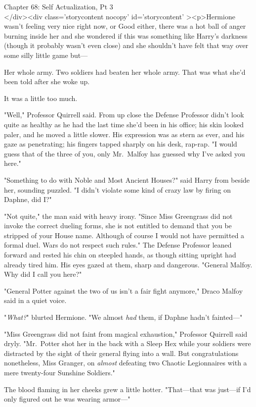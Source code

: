
Chapter 68: Self Actualization, Pt 3\\
</div><div  class='storycontent nocopy' id='storycontent' ><p>Hermione wasn't 
feeling very nice right now, or Good either, there was a hot ball of anger 
burning inside her and she wondered if this was something like Harry's darkness 
(though it probably wasn't even close) and she shouldn't have felt that way 
over some silly little game but---

Her whole army. Two soldiers had beaten her whole army. That was what she'd 
been told after she woke up.

It was a little too much.

"Well," Professor Quirrell said. From up close the Defense Professor didn't 
look quite as healthy as he had the last time she'd been in his office; his 
skin looked paler, and he moved a little slower. His expression was as stern as 
ever, and his gaze as penetrating; his fingers tapped sharply on his desk, 
rap-rap. "I would guess that of the three of you, only Mr.~Malfoy has guessed 
why I've asked you here."

"Something to do with Noble and Most Ancient Houses?" said Harry from beside 
her, sounding puzzled. "I didn't violate some kind of crazy law by firing on 
Daphne, did I?"

"Not quite," the man said with heavy irony. "Since Miss Greengrass did not 
invoke the correct dueling forms, she is not entitled to demand that you be 
stripped of your House name. Although of course I would not have permitted a 
formal duel. Wars do not respect such rules." The Defense Professor leaned 
forward and rested his chin on steepled hands, as though sitting upright had 
already tired him. His eyes gazed at them, sharp and dangerous. "General 
Malfoy. Why did I call you here?"

"General Potter against the two of us isn't a fair fight anymore," Draco Malfoy 
said in a quiet voice.

"\emph{What?}" blurted Hermione. "We almost \emph{had} them, if Daphne hadn't 
fainted---"

"Miss Greengrass did not faint from magical exhaustion," Professor Quirrell 
said dryly. "Mr.~Potter shot her in the back with a Sleep Hex while your 
soldiers were distracted by the sight of their general flying into a wall. But 
congratulations nonetheless, Miss Granger, on \emph{almost} defeating two 
Chaotic Legionnaires with a mere twenty-four Sunshine Soldiers."

The blood flaming in her cheeks grew a little hotter. "That---that was 
just---if I'd only figured out he was wearing armor---"

